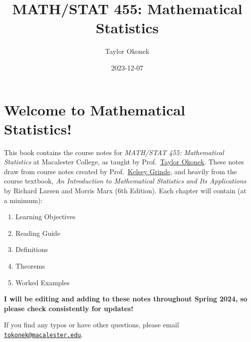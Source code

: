 \documentclass[
  letterpaper,
  DIV=11,
  numbers=noendperiod]{scrreprt}
\title{MATH/STAT 455: Mathematical Statistics}
\author{Taylor Okonek}
\date{2023-12-07}
\renewcommand*\contentsname{Table of contents}
\newcommand\contentsname{Table of contents}
\begin{document}
\maketitle
\ifdefined\Shaded\renewenvironment{Shaded}{\begin{tcolorbox}[sharp corners, interior hidden, enhanced, boxrule=0pt, frame hidden, breakable, borderline west={3pt}{0pt}{shadecolor}]}{\end{tcolorbox}}\fi

\renewcommand*\contentsname{Table of contents}
{
\hypersetup{linkcolor=}
\setcounter{tocdepth}{2}
\tableofcontents
}

\hypertarget{welcome-to-mathematical-statistics}{%
\chapter*{Welcome to Mathematical
Statistics!}\label{welcome-to-mathematical-statistics}}


This book contains the course notes for \emph{MATH/STAT 455:}
\emph{Mathematical Statistics} at Macalester College, as taught by
Prof.~\href{https://taylorokonek.github.io/}{Taylor Okonek}. These notes
draw from course notes created by
Prof.~\href{https://kegrinde.github.io/}{Kelsey Grinde}, and heavily
from the course textbook, \emph{An Introduction to Mathematical
Statistics and Its Applications} by Richard Larsen and Morris Marx (6th
Edition). Each chapter will contain (at a minimum):

\begin{enumerate}
\def\labelenumi{\arabic{enumi}.}
\item
  Learning Objectives
\item
  Reading Guide
\item
  Definitions
\item
  Theorems
\item
  Worked Examples
\end{enumerate}

\textbf{I will be editing and adding to these notes throughout Spring
2024, so please check consistently for updates!}

If you find any typos or have other questions, please email
\href{mailto:tokonek@macalester.edu}{\nolinkurl{tokonek@macalester.edu}}.

\begin{verbatim}
\end{verbatim}
\end{document}
